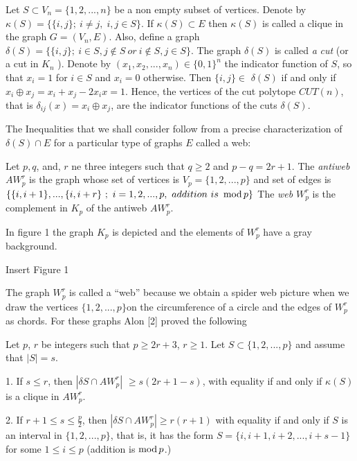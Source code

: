 Let $S\subset V_{n}=\{1,2,...,n\}$ be a non empty subset of vertices. Denote
by $\kappa (S)=\{\{i,j\};\ i\neq j,\;i,j\in S\}$. If $\kappa (S)\subset E$
then $\kappa (S)$ is called a clique in the graph $G=(V_{n},E)$. Also,
define a graph $\delta (S)=\{\{i,j\};\ i\in S,j\notin S\ or\ i\notin S,j\in
S\}$. The graph $\delta (S)$ is called {\em a} {\em cut} (or a cut in $K_{n}$%
). Denote by $(x_{1},x_{2},...,x_{n})\in \{0,1\}^{n}$ the indicator function
of $S$, so that $x_{i}=1$ for $i\in S$ and $x_{i}=0$ otherwise. Then $%
\{i,j\}\in $ $\delta (S)$ if and only if $x_{i}\oplus
x_{j}=x_{i}+x_{j}-2x_{i}x=1$. Hence, the vertices of the cut polytope $%
CUT(n) $, that is $\delta _{ij}(x)=x_{i}\oplus x_{j}$, are the indicator
functions of the cuts $\delta (S)$.

The Inequalities that we shall consider follow from a precise
characterization of $\delta (S)\cap E$ for a particular type of graphs $E$
called a web:

\begin{definition}
Let $p,q$, and, $r$ ne three integers such that $q\geq 2$ and $p-q=2r+1$.
The {\em antiweb }$AW_{p}^{r}$ is the graph whose set of vertices is $%
V_{p}=\{1,2,...,p\}$ and set of edges is $\{\{i,i+1\},...,\{i,i+r\}\ ;\
i=1,2,...,p,\ addition\ is\
\mathop{\rm mod}%
p\}$ The {\em web} $W_{p}^{r}$ is the complement in $K_{p}$ of the antiweb $%
AW_{p}^{r}$.
\end{definition}

In figure 1 the graph $K_{p}$ is depicted and the elements of $W_{p}^{r}$
have a gray background.

\begin{center}
{\large Insert Figure 1}
\end{center}

The graph $W_{p}^{r}$ is called a ``web'' because we obtain a spider web
picture when we draw the vertices $\{1,2,...,p\}$on the circumference of a
circle and the edges of $W_{p}^{r}$ as chords. For these graphs Alon [2]
proved the following

\begin{theorem}
Let $p$, $r$ be integers such that $p\geq 2r+3$, $r\geq 1$. Let $S\subset
\{1,2,...,p\}$ and assume that $\left| S\right| =s$.

1. If $s\leq r$, then $\left| \delta S\cap AW_{p}^{r}\right| $ $\geq
s(2r+1-s)$, with equality if and only if $\kappa (S)$ is a clique in $%
AW_{p}^{r}$.

2. If $r+1\leq s\leq \frac{p}{2}$, then $\left| \delta S\cap
AW_{p}^{r}\right| \geq r(r+1)$ with equality if and only if $S$ is an
interval in $\{1,2,...,p\}$, that is, it has the form $S=%
\{i,i+1,i+2,...,i+s-1\}$ for some $1\leq i\leq p$ (addition is $%
\mathop{\rm mod}%
p$.)
\end{theorem}

